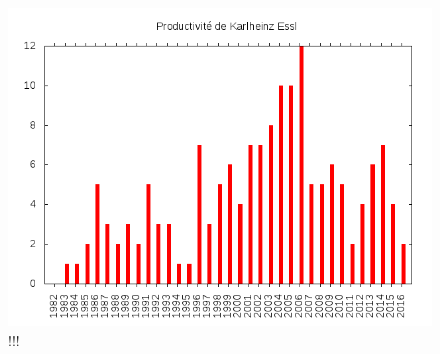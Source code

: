 \documentclass[a4paper,12pt]{article}
\begin{document}
\begin{figure}[h!]
\begin{center}
\includegraphics[width=12cm]{../Divers/plots/NumberOfWorks.png}
\caption{\footnotesize !!!}
\end{center}
\label{productivite}
\end{figure}
\end{document}
